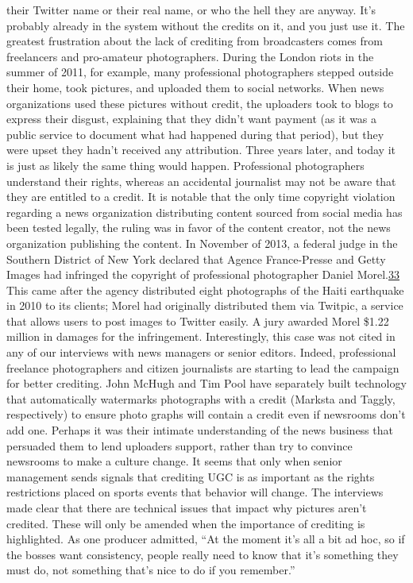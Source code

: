 \documentclass[symmetric, notoc, nobib]{towcenter-book}
\begin{document}
their Twitter name or their real name, or who the hell they are anyway.
It's probably already in the system without the credits on it, and
you just use it.
The greatest frustration about the lack of crediting from broadcasters
comes from freelancers and pro-amateur photographers. During the London
riots in the summer of 2011, for example, many professional photographers
stepped outside their home, took pictures, and uploaded them to
social networks. When news organizations used these pictures without
credit, the uploaders took to blogs to express their disgust, explaining that
they didn't want payment (as it was a public service to document what had
happened during that period), but they were upset they hadn't received any
attribution. Three years later, and today it is just as likely the same thing
would happen.
Professional photographers understand their rights, whereas an accidental
journalist may not be aware that they are entitled to a credit. It is notable
that the only time copyright violation regarding a news organization distributing
content sourced from social media has been tested legally, the
ruling was in favor of the content creator, not the news organization publishing
the content. In November of 2013, a federal judge in the Southern
District of New York declared that Agence France-Presse and Getty
Images had infringed the copyright of professional photographer Daniel
Morel.{\href{#endnotes}{33}} This came after the agency distributed eight photographs of the
Haiti earthquake in 2010 to its clients; Morel had originally distributed
them via Twitpic, a service that allows users to post images to Twitter easily.
A jury awarded Morel \$1.22 million in damages for the infringement.
Interestingly, this case was not cited in any of our interviews with news
managers or senior editors.
Indeed, professional freelance photographers and citizen journalists are
starting to lead the campaign for better crediting. John McHugh and Tim
Pool have separately built technology that automatically watermarks photographs
with a credit (Marksta and Taggly, respectively) to ensure photo
graphs will contain a credit even if newsrooms don't add one. Perhaps it was
their intimate understanding of the news business that persuaded them to
lend uploaders support, rather than try to convince newsrooms to make a
culture change.
It seems that only when senior management sends signals that crediting
UGC is as important as the rights restrictions placed on sports events that
behavior will change. The interviews made clear that there are technical
issues that impact why pictures aren't credited. These will only be amended
when the importance of crediting is highlighted.
As one producer admitted, ``At the moment it's all a bit ad hoc, so if the
bosses want consistency, people really need to know that it's something
they must do, not something that's nice to do if you remember.''
\end{document}
